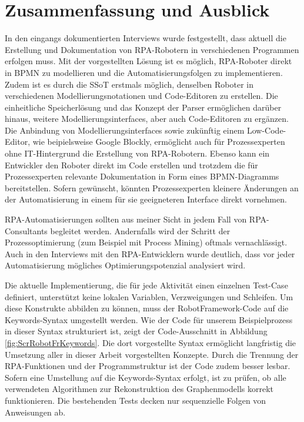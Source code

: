 \section{Zusammenfassung und Ausblick}
\label{conclusion}

In den eingangs dokumentierten Interviews wurde festgestellt, dass aktuell die Erstellung und Dokumentation von RPA-Robotern in verschiedenen Programmen erfolgen muss. Mit der vorgestellten Lösung ist es möglich, RPA-Roboter direkt in BPMN zu modellieren und die Automatisierungsfolgen zu implementieren. Zudem ist es durch die SSoT erstmals möglich, denselben Roboter in verschiedenen Modellierungsnotationen und Code-Editoren zu erstellen. Die einheitliche Speicherlösung und das Konzept der Parser ermöglichen darüber hinaus, weitere Modellierungsinterfaces, aber auch Code-Editoren zu ergänzen. Die Anbindung von Modellierungsinterfaces sowie zukünftig einem Low-Code-Editor, wie beipielsweise Google Blockly, ermöglicht auch für Prozessexperten ohne IT-Hintergrund die Erstellung von RPA-Robotern. Ebenso kann ein Entwickler den Roboter direkt im Code erstellen und trotzdem die für Prozessexperten relevante Dokumentation in Form eines BPMN-Diagramms bereitstellen. Sofern gewünscht, könnten Prozessexperten kleinere Änderungen an der Automatisierung in einem für sie geeigneteren Interface direkt vornehmen.

RPA-Automatisierungen sollten aus meiner Sicht in jedem Fall von RPA-Consultants begleitet werden. Andernfalls wird der Schritt der Prozessoptimierung (zum Beispiel mit Process Mining) oftmals vernachlässigt. Auch in den Interviews mit den RPA-Entwicklern wurde deutlich, dass vor jeder Automatisierung mögliches Optimierungspotenzial analysiert wird.

Die aktuelle Implementierung, die für jede Aktivität einen einzelnen Test-Case definiert, unterstützt keine lokalen Variablen, Verzweigungen und Schleifen. Um diese Konstrukte abbilden zu können, muss der RobotFramework-Code auf die Keywords-Syntax umgestellt werden. Wie der Code für unserem Beispielprozess in dieser Syntax strukturiert ist, zeigt der Code-Ausschnitt in Abbildung \ref{fig:ScrRobotFrKeywords}. Die dort vorgestellte Syntax ermöglicht langfristig die Umsetzung aller in dieser Arbeit vorgestellten Konzepte. Durch die Trennung der RPA-Funktionen und der Programmstruktur ist der Code zudem besser lesbar. 
Sofern eine Umstellung auf die Keywords-Syntax erfolgt, ist zu prüfen, ob alle verwendeten Algorithmen zur Rekonstruktion des Graphenmodells korrekt funktionieren. Die bestehenden Tests decken nur sequenzielle Folgen von Anweisungen ab.

